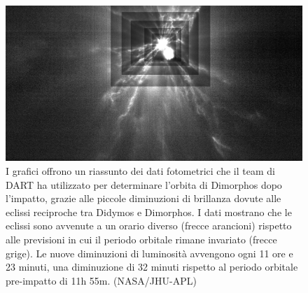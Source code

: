 \documentclass[a4paper,11pt,openright]{book}
\begin{document}
\begin{figure}
    \centering
    \includegraphics[width=\textwidth]{figure/liciacube_impact_tot.jpg}
    \caption[Riassunto dei dati fotometrici utilizzati per determinare l'orbita post-impatto.]{I grafici offrono un riassunto dei dati fotometrici che il team di DART ha utilizzato per determinare l'orbita di Dimorphos dopo l'impatto, grazie alle piccole diminuzioni di brillanza dovute alle eclissi reciproche tra Didymos e Dimorphos. I dati mostrano che le eclissi sono avvenute a un orario diverso (frecce arancioni) rispetto alle previsioni in cui il periodo orbitale rimane invariato (frecce grige). Le nuove diminuzioni di luminosità avvengono ogni 11 ore e 23 minuti, una diminuzione di 32 minuti rispetto al periodo orbitale pre-impatto di 11h 55m. (NASA/JHU-APL)}
    \label{fig:liciacube_impact_tot}
\end{figure}


\cleardoublepage
{}
\printbibliography
\end{document}
